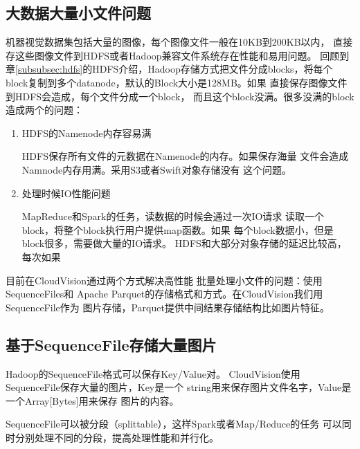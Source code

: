 \subsection{大数据大量小文件问题}
\label{subsec:big-data-small-files}
机器视觉数据集包括大量的图像，每个图像文件一般在10KB到200KB以内，
直接存这些图像文件到HDFS或者Hadoop兼容文件系统存在性能和易用问题。
回顾到章\ref{subsubsec:hdfs}的HDFS介绍，Hadoop存储方式把文件分成blocks，将每个
block复制到多个datanode，默认的Block大小是128MB。如果
直接保存图像文件到HDFS会造成，每个文件分成一个block，
而且这个block没满。很多没满的block造成两个的问题：
\begin{enumerate}
  \item HDFS的Namenode内存容易满

        HDFS保存所有文件的元数据在Namenode的内存。如果保存海量
        文件会造成Namnode内存用满。采用S3或者Swift对象存储没有
        这个问题。

  \item 处理时候IO性能问题
        
        MapReduce和Spark的任务，读数据的时候会通过一次IO请求
        读取一个block，将整个block执行用户提供map函数。如果
        每个block数据小，但是block很多，需要做大量的IO请求。
        HDFS和大部分对象存储的延迟比较高，每次如果
\end{enumerate}



目前在CloudVision通过两个方式解决高性能
批量处理小文件的问题：使用SequenceFiles和
Apache Parquet的存储格式和方式。在CloudVision我们用SequenceFile作为
图片存储，Parquet提供中间结果存储结构比如图片特征。


\subsection{基于SequenceFile存储大量图片}
\label{subsec:seq-file}
Hadoop的SequenceFile格式可以保存Key/Value对。
CloudVision使用SequenceFile保存大量的图片，Key是一个
string用来保存图片文件名字，Value是一个Array[Bytes]用来保存
图片的内容。

SequenceFile可以被分段（splittable），这样Spark或者Map/Reduce的任务
可以同时分别处理不同的分段，提高处理性能和并行化。

